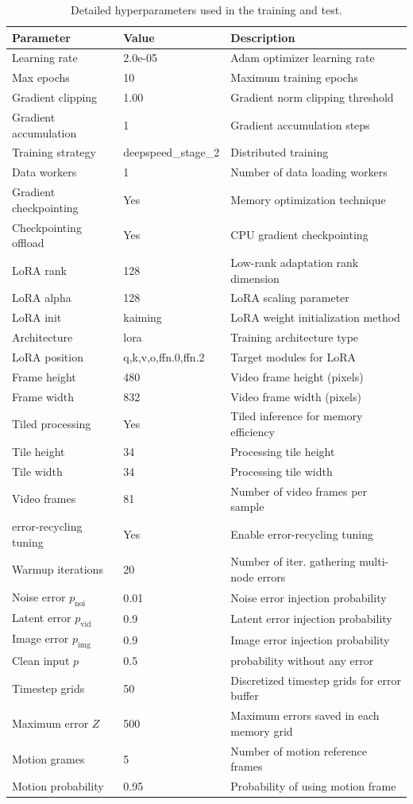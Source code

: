 \documentclass{article} %
\newcommand\vid{\mathrm{vid}}
\newcommand\noi{\mathrm{noi}}
\newcommand\img{\mathrm{img}}
\begin{document}
\begin{table}[t]
\centering
\small
\begin{tabular}{lll}
\toprule
\textbf{Parameter} & \textbf{Value} & \textbf{Description} \\
\midrule
Learning rate & 2.0e-05 & Adam optimizer learning rate \\
Max epochs & 10 & Maximum training epochs \\
Gradient clipping & 1.00 & Gradient norm clipping threshold \\
Gradient accumulation & 1 & Gradient accumulation steps \\
Training strategy & deepspeed\_stage\_2 & Distributed training \\
Data workers & 1 & Number of data loading workers \\
Gradient checkpointing & Yes & Memory optimization technique \\
Checkpointing offload & Yes & CPU gradient checkpointing \\
\midrule
LoRA rank & 128 & Low-rank adaptation rank dimension \\
LoRA alpha & 128 & LoRA scaling parameter \\
LoRA init & kaiming & LoRA weight initialization method \\
Architecture & lora & Training architecture type \\
LoRA position & q,k,v,o,ffn.0,ffn.2 & Target modules for LoRA \\
Frame height & 480 & Video frame height (pixels) \\
Frame width & 832 & Video frame width (pixels) \\
Tiled processing & Yes & Tiled inference for memory efficiency \\
Tile height & 34 & Processing tile height \\
Tile width & 34 & Processing tile width \\
Video frames & 81 & Number of video frames per sample \\
\midrule
error-recycling tuning & Yes & Enable error-recycling tuning \\
Warmup iterations & 20 & Number of iter. gathering multi-node errors \\
Noise error $p_\noi$& 0.01 & Noise error injection probability \\
Latent error $p_\vid$& 0.9 & Latent error injection probability \\
Image error $p_\img$& 0.9 & Image error injection probability \\
Clean input $p$&0.5 & probability without any error\\
Timestep grids & 50 &Discretized timestep grids for error buffer \\
Maximum error $Z$& 500 &Maximum errors saved in each memory grid \\
Motion grames & 5 & Number of motion reference frames \\
Motion probability & 0.95 & Probability of using motion frame \\
\bottomrule
\end{tabular}
\caption{Detailed hyperparameters used in the training and test.}
\label{tab:training_params}
\end{table}
\end{document}
